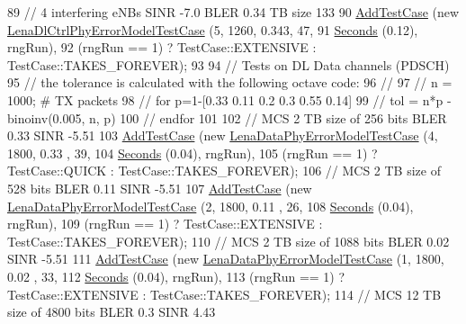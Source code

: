 \begin{DoxyCode}
89       \textcolor{comment}{// 4 interfering eNBs SINR -7.0 BLER 0.34 TB size 133}
90       \hyperlink{classns3_1_1TestCase_a3718088e3eefd5d6454569d2e0ddd835}{AddTestCase} (\textcolor{keyword}{new} \hyperlink{classLenaDlCtrlPhyErrorModelTestCase}{LenaDlCtrlPhyErrorModelTestCase} (5, 1260, 
      0.343, 47,
91                                                         \hyperlink{group__timecivil_ga33c34b816f8ff6628e33d5c8e9713b9e}{Seconds} (0.12), rngRun),
92                    (rngRun == 1) ? TestCase::EXTENSIVE : TestCase::TAKES\_FOREVER);
93 
94       \textcolor{comment}{// Tests on DL Data channels (PDSCH)}
95       \textcolor{comment}{// the tolerance is calculated with the following octave code:}
96       \textcolor{comment}{//}
97       \textcolor{comment}{// n =  1000; # TX packets}
98       \textcolor{comment}{// for p=1-[0.33 0.11 0.2 0.3 0.55 0.14]}
99       \textcolor{comment}{//    tol = n*p - binoinv(0.005, n, p)}
100       \textcolor{comment}{// endfor}
101 
102       \textcolor{comment}{// MCS 2 TB size of 256 bits BLER 0.33 SINR -5.51}
103       \hyperlink{classns3_1_1TestCase_a3718088e3eefd5d6454569d2e0ddd835}{AddTestCase} (\textcolor{keyword}{new} \hyperlink{classLenaDataPhyErrorModelTestCase}{LenaDataPhyErrorModelTestCase} (4, 1800, 0.33
      , 39,
104                                                       \hyperlink{group__timecivil_ga33c34b816f8ff6628e33d5c8e9713b9e}{Seconds} (0.04), rngRun),
105                    (rngRun == 1) ? TestCase::QUICK : TestCase::TAKES\_FOREVER);
106       \textcolor{comment}{// MCS 2 TB size of 528 bits BLER 0.11 SINR -5.51}
107       \hyperlink{classns3_1_1TestCase_a3718088e3eefd5d6454569d2e0ddd835}{AddTestCase} (\textcolor{keyword}{new} \hyperlink{classLenaDataPhyErrorModelTestCase}{LenaDataPhyErrorModelTestCase} (2, 1800, 0.11
      , 26,
108                                                       \hyperlink{group__timecivil_ga33c34b816f8ff6628e33d5c8e9713b9e}{Seconds} (0.04), rngRun),
109                    (rngRun == 1) ? TestCase::EXTENSIVE : TestCase::TAKES\_FOREVER);
110       \textcolor{comment}{// MCS 2 TB size of 1088 bits BLER 0.02 SINR -5.51}
111       \hyperlink{classns3_1_1TestCase_a3718088e3eefd5d6454569d2e0ddd835}{AddTestCase} (\textcolor{keyword}{new} \hyperlink{classLenaDataPhyErrorModelTestCase}{LenaDataPhyErrorModelTestCase} (1, 1800, 0.02
      , 33,
112                                                       \hyperlink{group__timecivil_ga33c34b816f8ff6628e33d5c8e9713b9e}{Seconds} (0.04), rngRun),
113                    (rngRun == 1) ? TestCase::EXTENSIVE : TestCase::TAKES\_FOREVER);
114       \textcolor{comment}{// MCS 12 TB size of 4800 bits  BLER 0.3  SINR 4.43}

\end{DoxyCode}
